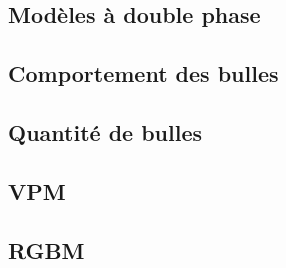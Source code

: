 \subsection{Modèles à double phase}


\subsection{Comportement des bulles}


\subsection{Quantité de bulles}


\subsection{VPM}


\subsection{RGBM}